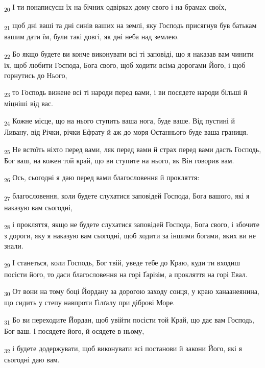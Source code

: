 \begin{tcolorbox}
\textsubscript{20} І ти понаписуєш їх на бічних одвірках дому свого і на брамах своїх,
\end{tcolorbox}
\begin{tcolorbox}
\textsubscript{21} щоб дні ваші та дні синів ваших на землі, яку Господь присягнув був батькам вашим дати їм, були такі довгі, як дні неба над землею.
\end{tcolorbox}
\begin{tcolorbox}
\textsubscript{22} Бо якщо будете ви конче виконувати всі ті заповіді, що я наказав вам чинити їх, щоб любити Господа, Бога свого, щоб ходити всіма дорогами Його, і щоб горнутись до Нього,
\end{tcolorbox}
\begin{tcolorbox}
\textsubscript{23} то Господь вижене всі ті народи перед вами, і ви посядете народи більші й міцніші від вас.
\end{tcolorbox}
\begin{tcolorbox}
\textsubscript{24} Кожне місце, що на нього ступить ваша нога, буде ваше. Від пустині й Ливану, від Річки, річки Ефрату й аж до моря Останнього буде ваша границя.
\end{tcolorbox}
\begin{tcolorbox}
\textsubscript{25} Не встоїть ніхто перед вами, ляк перед вами й страх перед вами дасть Господь, Бог ваш, на кожен той край, що ви ступите на нього, як Він говорив вам.
\end{tcolorbox}
\begin{tcolorbox}
\textsubscript{26} Ось, сьогодні я даю перед вами благословення й прокляття:
\end{tcolorbox}
\begin{tcolorbox}
\textsubscript{27} благословення, коли будете слухатися заповідей Господа, Бога вашого, які я наказую вам сьогодні,
\end{tcolorbox}
\begin{tcolorbox}
\textsubscript{28} і прокляття, якщо не будете слухатися заповідей Господа, Бога свого, і збочите з дороги, яку я наказую вам сьогодні, щоб ходити за іншими богами, яких ви не знали.
\end{tcolorbox}
\begin{tcolorbox}
\textsubscript{29} І станеться, коли Господь, Бог твій, уведе тебе до Краю, куди ти входиш посісти його, то даси благословення на горі Ґарізім, а прокляття на горі Евал.
\end{tcolorbox}
\begin{tcolorbox}
\textsubscript{30} От вони на тому боці Йордану за дорогою заходу сонця, у краю ханаанеянина, що сидить у степу навпроти Ґілґалу при діброві Море.
\end{tcolorbox}
\begin{tcolorbox}
\textsubscript{31} Бо ви переходите Йордан, щоб увійти посісти той Край, що дає вам Господь, Бог ваш. І посядете його, й осядете в ньому,
\end{tcolorbox}
\begin{tcolorbox}
\textsubscript{32} і будете додержувати, щоб виконувати всі постанови й закони Його, які я сьогодні даю вам.
\end{tcolorbox}
